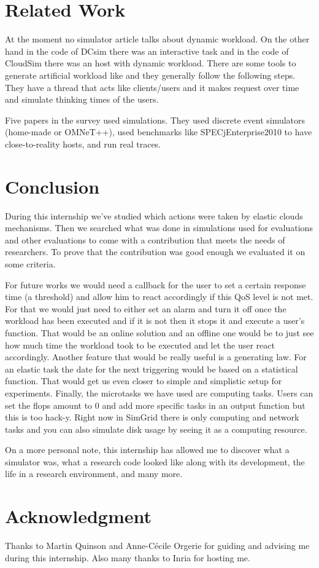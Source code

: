\documentclass[a4paper, onecolumn, 11pt]{article}
\begin{document}
\section{Related Work} \label{sota}
At the moment no simulator article talks about dynamic workload. On the other
hand in the code of DCsim \cite{tighe2013towards} there was an interactive task
and in the code of CloudSim \cite{calheiros2011cloudsim} there was an host with
dynamic workload. There are some tools to generate artificial workload like
\cite{bodik2010characterizing} and they generally follow the following steps.
They have a thread that acts like clients/users and it makes request over time
and simulate thinking times of the users.

Five papers in the survey used simulations. They used discrete event simulators
(home-made or OMNeT++), used benchmarks like SPECjEnterprise2010 to have
close-to-reality hosts, and run real traces.


\section{Conclusion} \label{conclu}
During this internship we've studied which actions were taken by elastic clouds
mechanisms. Then we searched what was done in simulations used for evaluations
and other evaluations to come with a contribution that meets the needs of
researchers. To prove that the contribution was good enough we evaluated it on
some criteria.

For future works we would need a callback for the user to set a certain response
time (a threshold) and allow him to react accordingly if this QoS level is not
met. For that we would just need to either set an alarm and turn it off once the
workload has been executed and if it is not then it stops it and execute a
user's function. That would be an online solution and an offline one would be to
just see how much time the workload took to be executed and let the user react
accordingly. Another feature that would be really useful is a generating law.
For an elastic task the date for the next triggering would be based on a
statistical function. That would get us even closer to simple and simplistic
setup for experiments. Finally, the microtasks we have used are computing tasks.
Users can set the flops amount to 0 and add more specific tasks in an output
function but this is too hack-y. Right now in SimGrid there is only computing
and network tasks and you can also simulate disk usage by seeing it as a
computing resource. %

On a more personal note, this internship has allowed me to discover what a
simulator was, what a research code looked like along with its development, the
life in a research environment, and many more.


\section*{Acknowledgment}
Thanks to Martin Quinson and Anne-C\'ecile Orgerie for guiding and advising me 
during this internship. Also many thanks to Inria for hosting me.




\end{document}

